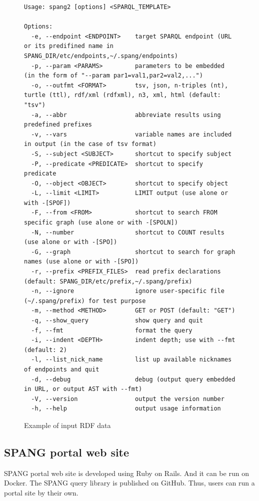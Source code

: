 \documentclass[runningheads]{llncs}
\begin{document}
\begin{figure}[!t]
\begin{scriptsize}
\begin{verbatim}
Usage: spang2 [options] <SPARQL_TEMPLATE>

Options:
  -e, --endpoint <ENDPOINT>    target SPARQL endpoint (URL or its predifined name in SPANG_DIR/etc/endpoints,~/.spang/endpoints)
  -p, --param <PARAMS>         parameters to be embedded (in the form of "--param par1=val1,par2=val2,...")
  -o, --outfmt <FORMAT>        tsv, json, n-triples (nt), turtle (ttl), rdf/xml (rdfxml), n3, xml, html (default: "tsv")
  -a, --abbr                   abbreviate results using predefined prefixes
  -v, --vars                   variable names are included in output (in the case of tsv format)
  -S, --subject <SUBJECT>      shortcut to specify subject
  -P, --predicate <PREDICATE>  shortcut to specify predicate
  -O, --object <OBJECT>        shortcut to specify object
  -L, --limit <LIMIT>          LIMIT output (use alone or with -[SPOF])
  -F, --from <FROM>            shortcut to search FROM specific graph (use alone or with -[SPOLN])
  -N, --number                 shortcut to COUNT results (use alone or with -[SPO])
  -G, --graph                  shortcut to search for graph names (use alone or with -[SPO])
  -r, --prefix <PREFIX_FILES>  read prefix declarations (default: SPANG_DIR/etc/prefix,~/.spang/prefix)
  -n, --ignore                 ignore user-specific file (~/.spang/prefix) for test purpose
  -m, --method <METHOD>        GET or POST (default: "GET")
  -q, --show_query             show query and quit
  -f, --fmt                    format the query
  -i, --indent <DEPTH>         indent depth; use with --fmt (default: 2)
  -l, --list_nick_name         list up available nicknames of endpoints and quit
  -d, --debug                  debug (output query embedded in URL, or output AST with --fmt)
  -V, --version                output the version number
  -h, --help                   output usage information

\end{verbatim}
\end{scriptsize}
\caption{Example of input RDF data}
\label{fig:example-rdf}
\end{figure}



\subsection{SPANG portal web site}
SPANG portal web site is developed using Ruby on Rails. And it can be run on Docker. The SPANG query library is published on GitHub. Thus, users can run a portal site by their own.
\end{document}
